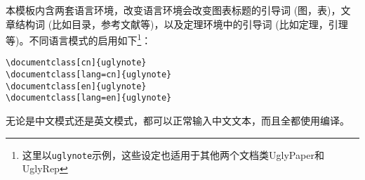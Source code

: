 本模板内含两套语言环境，改变语言环境会改变图表标题的引导词 (图，表)，文章结构词 (比如目录，参考文献等)，以及定理环境中的引导词 (比如定理，引理等)。不同语言模式的启用如下\footnote{这里以\texttt{uglynote}示例，这些设定也适用于其他两个文档类UglyPaper和UglyRep}：

\begin{verbatim} 
\documentclass[cn]{uglynote} 
\documentclass[lang=cn]{uglynote} 
\documentclass[en]{uglynote} 
\documentclass[lang=en]{uglynote}
\end{verbatim}

\begin{note}
  无论是中文模式还是英文模式，都可以正常输入中文文本，而且全都使用编译。
\end{note}